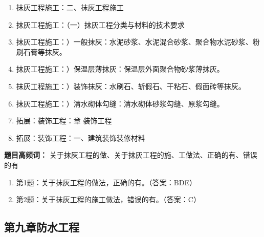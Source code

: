 \documentclass[UTF8,fontset=fandol,11pt]{ctexart}
\begin{document}
\begin{reviewbox}

\begin{enumerate}[label=\arabic*.]

\item 抹灰工程施工：二、抹灰工程施工

\item 抹灰工程施工：（一）抹灰工程分类与材料的技术要求

\item 抹灰工程施工：）一般抹灰：水泥砂浆、水泥混合砂浆、聚合物水泥砂浆、粉刷石膏等抹灰。

\item 抹灰工程施工：）保温层薄抹灰：保温层外面聚合物砂浆薄抹灰。

\item 抹灰工程施工：）装饰抹灰：水刷石、斩假石、干粘石、假面砖等抹灰。

\item 抹灰工程施工：）清水砌体勾缝：清水砌体砂浆勾缝、原浆勾缝。

\item 拓展：装饰工程：章 装饰工程

\item 拓展：装饰工程：一、建筑装饰装修材料

\end{enumerate}

\end{reviewbox}

\begin{mainbox}

\textbf{题目高频词：} 关于抹灰工程的做、关于抹灰工程的施、工做法、正确的有、错误的有

\end{mainbox}

\begin{enumerate}[label=\arabic*.]

\item 第1题：关于抹灰工程的做法，正确的有。（答案：BDE）

\item 第2题：关于抹灰工程的施工做法，错误的有。（答案：C）

\end{enumerate}

\newpage

\subsection*{第九章防水工程}
\end{document}
